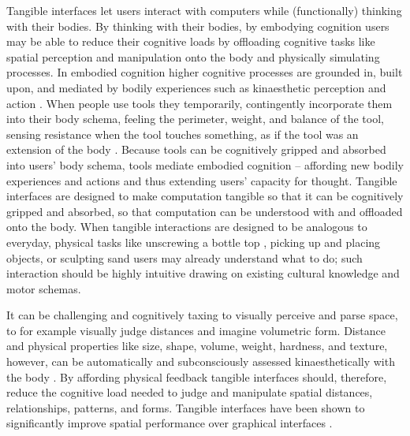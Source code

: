 \documentclass[prodmode,acmtochi]{acmsmall} %
\begin{document}
Tangible interfaces let users interact with computers while (functionally) thinking with their bodies. 
%
By thinking with their bodies, by embodying cognition 
users may be able to reduce their cognitive loads by
offloading cognitive tasks like 
spatial perception and manipulation 
onto the body and 
physically simulating processes.
%
In embodied cognition higher cognitive processes are grounded in, built upon, and mediated by bodily experiences such as kinaesthetic perception and action \cite{Hardy-Vallee2008}. 
%
When people use tools they temporarily, contingently incorporate them into their body schema, feeling the perimeter, weight, and balance of the tool, 
sensing resistance when the tool touches something, 
as if the tool was an extension of the body \cite{Maravita2004}.
%
Because tools can be cognitively gripped and absorbed into users' body schema, tools mediate embodied cognition -- affording new bodily experiences and actions and thus extending users' capacity for thought. 
%
Tangible interfaces are designed to make computation tangible so that it can be cognitively gripped and absorbed, so that computation can be understood with and offloaded onto the body.
%
When tangible interactions are designed to be analogous to everyday, physical tasks 
like unscrewing a bottle top \cite{Kirsh2013}, 
picking up and placing objects, 
or sculpting sand 
users may already understand what to do; 
such interaction should be highly intuitive
drawing on existing cultural knowledge and motor schemas. 

It can be challenging and cognitively taxing to visually perceive and parse space, to for example visually judge distances and imagine volumetric form.
%
Distance and physical properties like size, shape, volume, weight, hardness, and texture, however, can be automatically and subconsciously assessed kinaesthetically with the body \cite{Jeannerod1997}. 
%
By affording physical feedback tangible interfaces should, therefore, reduce the cognitive load needed to judge and manipulate spatial distances, relationships, patterns, and forms. 
%
Tangible interfaces have been shown to significantly improve spatial performance 
over graphical interfaces \cite{Cuendet2012}.
\end{document}
